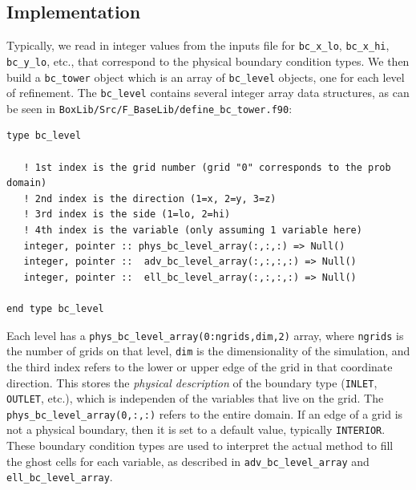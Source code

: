 \subsection{Implementation}
Typically, we read in integer values from the inputs file for {\tt bc\_x\_lo}, 
{\tt bc\_x\_hi}, {\tt bc\_y\_lo}, etc., that correspond to the physical boundary condition types.
We then build a {\tt bc\_tower} object which is an array of {\tt bc\_level} objects, one for
each level of refinement.  The {\tt bc\_level} contains several integer array data structures,
as can be seen in {\tt BoxLib/Src/F\_BaseLib/define\_bc\_tower.f90}:
\begin{lstlisting}[backgroundcolor=\color{light-green}]
type bc_level

   ! 1st index is the grid number (grid "0" corresponds to the prob domain)
   ! 2nd index is the direction (1=x, 2=y, 3=z)
   ! 3rd index is the side (1=lo, 2=hi)
   ! 4th index is the variable (only assuming 1 variable here)
   integer, pointer :: phys_bc_level_array(:,:,:) => Null()
   integer, pointer ::  adv_bc_level_array(:,:,:,:) => Null()
   integer, pointer ::  ell_bc_level_array(:,:,:,:) => Null()

end type bc_level
\end{lstlisting}
Each level has a {\tt phys\_bc\_level\_array(0:ngrids,dim,2)} array, where {\tt ngrids} is the number of
grids on that level, {\tt dim} is the dimensionality of the simulation, and the third index refers to
the lower or upper edge of the grid in that coordinate direction.  This stores the {\it physical description}
of the boundary type ({\tt INLET}, {\tt OUTLET}, etc.), which is independen of the variables that live on
the grid.  The {\tt phys\_bc\_level\_array(0,:,:)} refers to the entire domain.  If an edge of a grid is not
a physical boundary, then it is set to a default value, typically {\tt INTERIOR}.  These boundary condition
types are used to interpret the actual method to fill the ghost cells for each variable, as described
in {\tt adv\_bc\_level\_array} and {\tt ell\_bc\_level\_array}.

